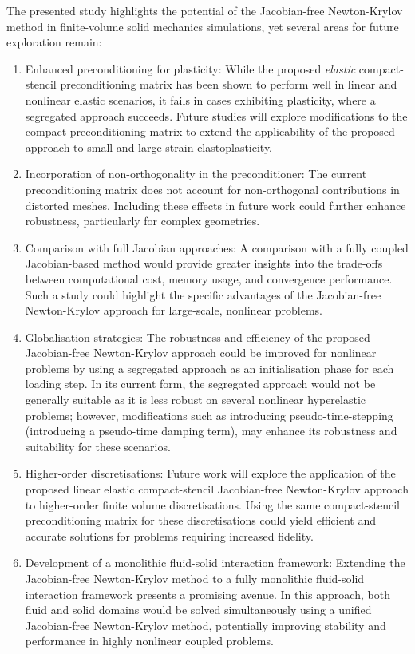 \documentclass[sn-mathphys,Numbered]{sn-jnl}%
\begin{document}
The presented study highlights the potential of the Jacobian-free Newton-Krylov method in finite-volume solid mechanics simulations, yet several areas for future exploration remain:
\begin{enumerate}
	\item{Enhanced preconditioning for plasticity}: While the proposed \emph{elastic} compact-stencil preconditioning matrix has been shown to perform well in linear and nonlinear elastic scenarios, it fails in cases exhibiting plasticity, where a segregated approach succeeds. Future studies will explore modifications to the compact preconditioning matrix to extend the applicability of the proposed approach to small and large strain elastoplasticity.

	\item{Incorporation of non-orthogonality in the preconditioner}: The current preconditioning matrix does not account for non-orthogonal contributions in distorted meshes. Including these effects in future work could further enhance robustness, particularly for complex geometries.

	\item{Comparison with full Jacobian approaches}: A comparison with a fully coupled Jacobian-based method would provide greater insights into the trade-offs between computational cost, memory usage, and convergence performance. Such a study could highlight the specific advantages of the Jacobian-free Newton-Krylov approach for large-scale, nonlinear problems.

	\item{Globalisation strategies}: The robustness and efficiency of the proposed Jacobian-free Newton-Krylov approach could be improved for nonlinear problems by using a segregated approach as an initialisation phase for each loading step. In its current form, the segregated approach would not be generally suitable as it is less robust on several nonlinear hyperelastic problems; however, modifications such as introducing pseudo-time-stepping (introducing a pseudo-time damping term), may enhance its robustness and suitability for these scenarios.

	\item{Higher-order discretisations}: Future work will explore the application of the proposed linear elastic compact-stencil Jacobian-free Newton-Krylov approach to higher-order finite volume discretisations. Using the same compact-stencil preconditioning matrix for these discretisations could yield efficient and accurate solutions for problems requiring increased fidelity.

	\item{Development of a monolithic fluid-solid interaction framework}: Extending the Jacobian-free Newton-Krylov method to a fully monolithic fluid-solid interaction framework presents a promising avenue. In this approach, both fluid and solid domains would be solved simultaneously using a unified Jacobian-free Newton-Krylov method, potentially improving stability and performance in highly nonlinear coupled problems.
\end{enumerate}
\end{document}
